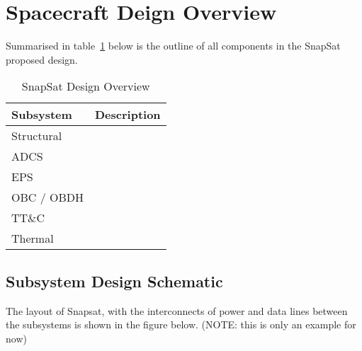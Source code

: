 \section{Spacecraft Deign Overview}
Summarised in table~\ref{tab:designoverview} below is the outline of all components in the SnapSat proposed design.

\begin{table}[H]
    \centering
    \caption{SnapSat Design Overview}
    \vspace{0.15cm}
    \label{tab:designoverview}
    {\renewcommand{\arraystretch}{1.4}%
        \begin{tabular}{|>{\arraybackslash}m{4cm}|>{\arraybackslash}m{10cm}|}
            \hline
            \textbf{Subsystem} & \textbf{Description} \\ \hline\hline
            Structural &  \\\hline
            ADCS &   \\\hline
            EPS &   \\\hline
            OBC / OBDH &   \\\hline
           TT\&C &   \\\hline
           Thermal &   \\\hline
        \end{tabular} } 
    \end{table}
    
\subsection{Subsystem Design Schematic}
The layout of Snapsat, with the interconnects of power and data lines between the subsystems is shown in the figure below. (NOTE: this is only an example for now)

\begin{figure}[H]
\end{figure}
